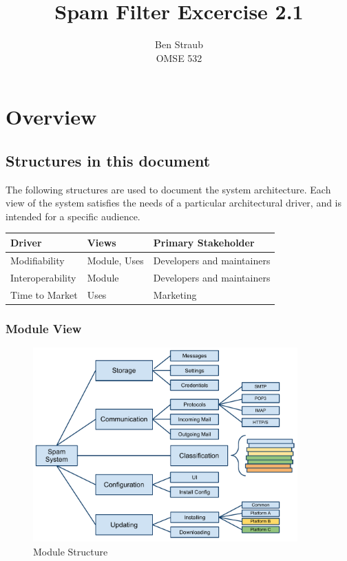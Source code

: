 \documentclass[letterpaper,11pt]{article}
\begin{document}
\author{Ben Straub\\OMSE 532}
\title{Spam Filter Excercise 2.1}
\maketitle

\setcounter{tocdepth}{1}
\tableofcontents
\clearpage


\section{Overview}


\subsection{Structures in this document}

The following structures are used to document the system architecture.  Each
view of the system satisfies the needs of a particular architectural driver,
and is intended for a specific audience.

\begin{center}
  \begin{tabular}[H]{lll}
    \textbf{Driver}  & \textbf{Views} & \textbf{Primary Stakeholder} \\
    \hline \hline                                                    
    Modifiability    & Module, Uses   & Developers and maintainers   \\
    Interoperability & Module         & Developers and maintainers   \\
    Time to Market   & Uses           & Marketing                    \\
  \end{tabular}
\end{center}

\subsubsection{Module View}
\begin{figure}[h!]
  \centering
  \includegraphics[width=4in]{ArchModuleDecomp.pdf}
  \caption{Module Structure}
  \label{fig:module}
\end{figure}
\end{document}
